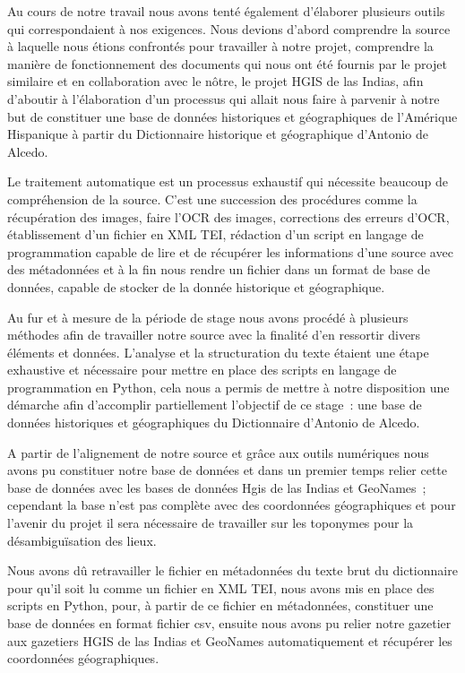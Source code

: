 \documentclass[a4paper,12pt,twoside]{book}
\begin{document}
Au cours de notre travail nous avons tenté également d’élaborer plusieurs outils qui correspondaient à nos exigences. Nous devions d’abord comprendre la source à laquelle nous étions confrontés pour travailler à notre projet, comprendre la manière de fonctionnement des documents qui nous ont été fournis par le projet similaire et en collaboration avec le nôtre, le projet HGIS de las Indias, afin d’aboutir à l’élaboration d’un processus qui allait nous faire à parvenir à notre but de constituer une base de données historiques et géographiques de l’Amérique Hispanique à partir du Dictionnaire historique et géographique d'Antonio de Alcedo.

Le traitement automatique est un processus exhaustif qui nécessite beaucoup de  compréhension de la source. C’est une succession des procédures comme la récupération des images, faire l’OCR des images, corrections des erreurs d’OCR, établissement d’un fichier en XML TEI, rédaction d’un script en langage de programmation capable de lire et de récupérer les informations d’une source avec des métadonnées et à la fin nous rendre un fichier dans un format de base de données, capable de stocker de la donnée historique et géographique.

Au fur et à mesure de la période de stage nous avons procédé à plusieurs méthodes afin de travailler notre source avec la finalité d’en ressortir divers éléments et données. L’analyse et la  structuration du texte étaient une étape exhaustive et nécessaire pour mettre en place des scripts en langage de programmation en Python, cela nous a permis de mettre à notre disposition une démarche afin d’accomplir partiellement l’objectif de ce stage : une base de données historiques et géographiques du Dictionnaire d’Antonio de Alcedo. 

A partir de l’alignement de notre source et grâce aux outils numériques nous avons pu constituer notre base de données et dans un premier temps relier cette base de données avec les bases de données Hgis de las Indias et GeoNames ; cependant la base n’est pas complète avec des coordonnées géographiques et pour l’avenir du projet il sera nécessaire de travailler sur les toponymes pour la désambiguïsation des lieux. 

Nous avons dû retravailler le fichier en métadonnées du texte brut du dictionnaire pour qu’il soit lu comme un fichier en XML TEI, nous avons mis en place des scripts en Python, pour, à partir de ce fichier en métadonnées, constituer une base de données en format fichier csv, ensuite nous avons pu relier notre gazetier aux gazetiers HGIS de las Indias et GeoNames automatiquement et récupérer les coordonnées géographiques. 
\end{document}
